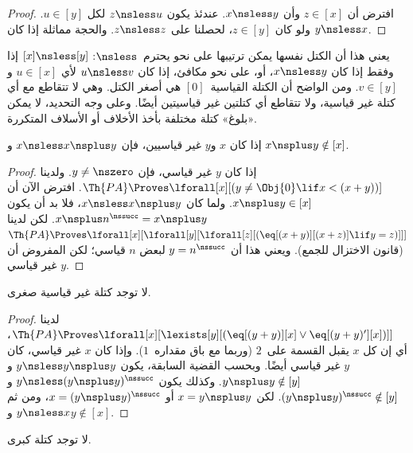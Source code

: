 \documentclass[../../../include/open-logic-section]{subfiles}
\begin{document}
\begin{proof}
افترض أن $z \in [x]$ وأن $x \nsless y$. عندئذ يكون $z \nsless u$
لكل $u \in [y]$. ولو كان $z \in [y]$، لحصلنا على $z \nsless z$.
والحجة مماثلة إذا كان $y \nsless x$.
\end{proof}

\begin{explain}
يعني هذا أن الكتل نفسها يمكن ترتيبها على نحو يحترم~$\nsless$:
$[x] \nsless [y]$ إذا وفقط إذا كان $x \nsless y$، أو، على نحو مكافئ،
إذا كان $u \nsless v$ لأي $u \in [x]$ و$v \in [y]$. ومن الواضح أن
الكتلة القياسية~$[0]$ هي أصغر الكتل. وهي لا تتقاطع مع أي كتلة غير
قياسية، ولا تتقاطع أي كتلتين غير قياسيتين أيضًا. وعلى وجه التحديد، لا
يمكن «بلوغ» كتلة مختلفة بأخذ الأخلاف أو الأسلاف المتكررة.
\end{explain}

\begin{prop}
إذا كان $x$ و$y$ غير قياسيين، فإن $x \nsless x \nsplus y$ و
$x \nsplus y \notin [x]$.
\end{prop}

\begin{proof}
إذا كان $y$ غير قياسي، فإن $y \neq \nszero$. ولدينا
$\Th{PA} \Proves \lforall[x][(y \neq \Obj{0} \lif x < (x+y))]$. افترض الآن أن
$x \nsplus y \in [x]$. ولما كان $x \nsless x \nsplus y$، فلا بد أن
يكون $x \nsplus n^\nssucc = x \nsplus y$. لكن لدينا
$\Th{PA} \Proves \lforall[x][\lforall[y][\lforall[z][(\eq[(x+y)][(x+z)] \lif y = z)]]]$
(قانون الاختزال للجمع). ويعني هذا أن $y = n^\nssucc$ لبعض $n$ قياسي؛
لكن المفروض أن $y$ غير قياسي.
\end{proof}

\begin{prop}
لا توجد كتلة غير قياسية صغرى.
\end{prop}

\begin{proof}
لدينا $\Th{PA} \Proves \lforall[x][\lexists[y][(\eq[(y+y)][x] \lor
      \eq[(y+y)'][x])]]$، أي إن كل $x$ يقبل القسمة على~$2$ (وربما
مع باق مقداره~$1$). وإذا كان $x$ غير قياسي، كان $y$ غير قياسي أيضًا.
وبحسب القضية السابقة، يكون $y \nsless y \nsplus y$ و
$y \nsplus y \notin [y]$. وكذلك يكون
$y \nsless (y \nsplus y)^\nssucc$ و
$(y \nsplus y)^\nssucc \notin [y]$. لكن
$x = y \nsplus y$ أو $x = (y \nsplus y)^\nssucc$، ومن ثم
$y \nsless x$ و$y \notin [x]$.
\end{proof}

\begin{prop}
لا توجد كتلة كبرى.
\end{prop}
\end{document}
